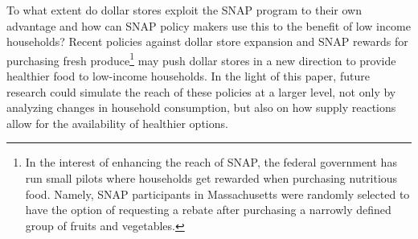 \documentclass[11.5pt]{article}
\begin{document}
To what extent do dollar stores exploit the SNAP program to their own advantage and how can SNAP policy makers use this to the benefit of low income households? Recent policies against dollar store expansion and SNAP rewards for purchasing fresh produce\footnote{In the interest of enhancing the reach of SNAP, the federal government has run small pilots where households get rewarded when purchasing nutritious food. Namely, SNAP  participants in Massachusetts were randomly selected to have the option of requesting a rebate after purchasing a narrowly defined group of fruits and vegetables.} may push dollar stores in a new direction to provide healthier food to low-income households. In the light of this paper, future research could simulate the reach of these policies at a larger level, not only by analyzing changes in household consumption, but also on how supply reactions allow for the availability of healthier options. 








\end{document}
